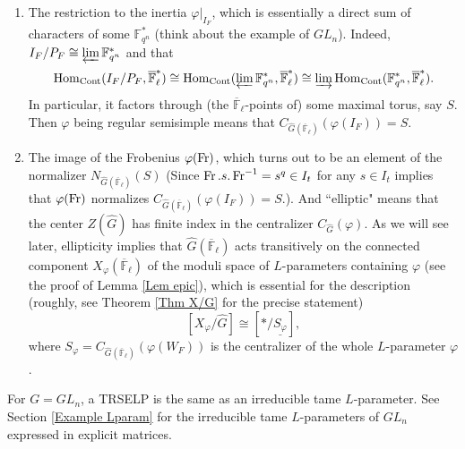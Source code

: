     \begin{enumerate}
    	\item The restriction to the inertia $\varphi|_{I_F}$, which is essentially a direct sum of characters of some $\mathbb{F}_{q^n}^*$ (think about the example of $GL_n$). Indeed, $I_F/P_F \cong \varprojlim\mathbb{F}_{q^n}^*$ and that
    	$$\operatorname{\operatorname{Hom}}_{\operatorname{Cont}}(I_F/P_F, \overline{\mathbb{F}}_{\ell}^*) \cong \operatorname{\operatorname{Hom}}_{\operatorname{Cont}}(\varprojlim\mathbb{F}_{q^n}^*, \overline{\mathbb{F}}_{\ell}^*) \cong \varinjlim\operatorname{\operatorname{Hom}}_{\operatorname{Cont}}(\mathbb{F}_{q^n}^*, \overline{\mathbb{F}}_{\ell}^*).$$
    	In particular, it factors through (the $\overline{\mathbb{F}}_{\ell}$-points of) some maximal torus, say $S$. Then $\varphi$ being regular semisimple means that $C_{\hat{G}(\overline{\mathbb{F}}_{\ell})}(\varphi(I_F))=S$.
    	\item The image of the Frobenius $\varphi(\operatorname{Fr})$, which turns out to be an element of the normalizer $N_{\hat{G}(\overline{\mathbb{F}}_{\ell})}(S)$ (Since $\operatorname{Fr}.s.\operatorname{Fr}^{-1}=s^q \in I_t$ for any $s \in I_t$ implies that $\varphi(\operatorname{Fr})$ normalizes $C_{\hat{G}(\overline{\mathbb{F}}_{\ell})}(\varphi(I_F))=S$.). 
        And ``elliptic" means that the center $Z(\hat{G})$ has finite index in the centralizer $C_{\hat{G}}(\varphi)$. As we will see later, ellipticity implies that $\hat{G}(\overline{\mathbb{F}}_{\ell})$ acts transitively on the connected component $X_{\varphi}(\overline{\mathbb{F}}_{\ell})$ of the moduli space of $L$-parameters containing $\varphi$ (see the proof of Lemma \ref{Lem epic}), which is essential for the description (roughly, see Theorem \ref{Thm X/G} for the precise statement)
    	$$[X_{\varphi}/\hat{G}] \cong [*/\underline{S_{\varphi}}],$$
    	where $S_\varphi=C_{\hat{G}(\overline{\mathbb{F}}_{\ell})}(\varphi(W_F))$ is the centralizer of the whole $L$-parameter $\varphi$.
    \end{enumerate}

    \begin{eg}
    	For $G=GL_n$, a TRSELP is the same as an irreducible tame $L$-parameter. See Section \ref{Example Lparam} for the irreducible tame $L$-parameters of $GL_n$ expressed in explicit matrices.
    \end{eg}

